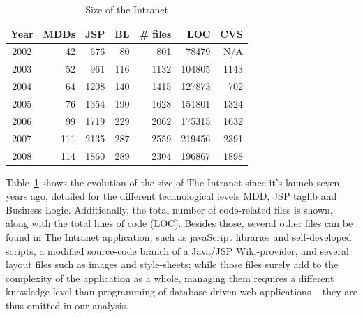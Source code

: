 \documentclass{acm_proc_article-sp}
\begin{document}
\begin{table}
	\centering
	\label{tab:intranet-size}
	\caption{Size of the Intranet}
	\begin{tabular}{c|r|r|r|r|r|r}
		\hline
		\hline
		Year	& MDDs	& JSP	& BL	& \# files	& LOC		& CVS	 \\
		\hline
		\hline
		2002 	& 42	& 676	& 80	& 801		& 78479 	& N/A	 \\ 
		\hline
		2003 	& 52	& 961	& 116	& 1132		& 104805 	& 1143	 \\ 
		\hline
		2004 	& 64	& 1208	& 140	& 1415		& 127873 	& 702	 \\ 
		\hline
		2005 	& 76	& 1354	& 190	& 1628		& 151801 	& 1324	 \\ 
		\hline
		2006 	& 99	& 1719	& 229	& 2062		& 175315 	& 1632	 \\ 
		\hline
		2007 	& 111	& 2135	& 287	& 2559		& 219456 	& 2391	 \\ 
		\hline
		2008 	& 114	& 1860	& 289	& 2304		& 196867 	& 1898	 \\ 
		\hline
		
		\hline
		\hline
	\end{tabular}
\end{table} 

Table~\ref{tab:intranet-size} shows the evolution of the size of The Intranet since it's launch seven years ago, detailed for the different technological levels MDD, JSP taglib and Business Logic. Additionally, the total number of code-related files is shown, along with the total lines of code (LOC). Besides those, several other files can be found in The Intranet application, such as javaScript libraries and self-developed scripts, a modified source-code branch of a Java/JSP Wiki-provider, and several layout files such as images and style-sheets; while those files surely add to the complexity of the application as a whole, managing them requires a different knowledge level than programming of database-driven web-applications -- they are thus omitted in our analysis.
\end{document}
